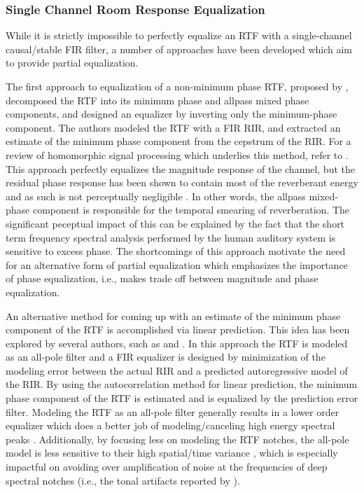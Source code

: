 \subsubsection{Single Channel Room Response Equalization}

While it is strictly impossible to perfectly equalize an RTF with a single-channel causal/stable FIR filter, a number of approaches have been developed which aim to provide partial equalization. 

The first approach to equalization of a non-minimum phase RTF, proposed by \cite{neely1979invertibility}, decomposed the RTF into its minimum phase and allpass mixed phase components, and designed an equalizer by inverting only the minimum-phase component. The authors modeled the RTF with a FIR RIR, and extracted an estimate of the minimum phase component from the cepstrum of the RIR. For a review of homomorphic signal processing which underlies this method, refer to \cite{quatieri2002discrete}. This approach perfectly equalizes the magnitude response of the channel, but the residual phase response has been shown to contain most of the reverberant energy and as such is not perceptually negligible \citep{johansen1996excess}. In other words, the allpass mixed-phase component is responsible for the temporal smearing of reverberation. The significant peceptual impact of this can be explained by the fact that the short term frequency spectral analysis performed by the human auditory system is sensitive to excess phase. The shortcomings of this approach motivate the need for an alternative form of partial equalization which emphasizes the importance of phase equalization, i.e., makes trade off between magnitude and phase equalization.

An alternative method for coming up with an estimate of the minimum phase component of the RTF is accomplished via linear prediction. This idea has been explored by several authors, such as \cite{mourjopoulos1991pole} and \cite{haneda1997multiple}. In this approach the RTF is modeled as an all-pole filter and a FIR equalizer is designed by minimization of the modeling error between the actual RIR and a predicted autoregressive model of the RIR. By using the autocorrelation method for linear prediction, the minimum phase component of the RTF is estimated and is equalized by the prediction error filter. Modeling the RTF as an all-pole filter generally results in a lower order equalizer which does a better job of modeling/canceling high energy spectral peaks \citep{toole1988modification}. Additionally, by focusing less on modeling the RTF notches, the all-pole model is less sensitive to their high spatial/time variance  \citep{mourjopoulos1985variation}, which is especially impactful on avoiding over amplification of noise at the frequencies of deep spectral notches (i.e., the tonal artifacts reported by \cite{neely1979invertibility}). 

